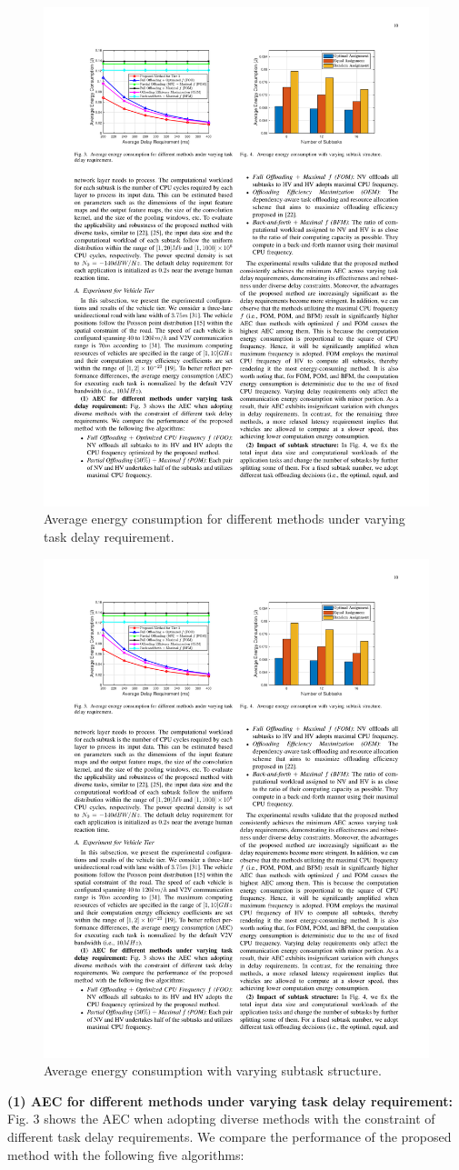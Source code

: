 \documentclass[lettersize,journal]{IEEEtran}
\begin{document}
\begin{figure}[!t]
\centering
\includegraphics[width=3 in]{Figures/Tier_1_E1}
\caption{Average energy consumption for different methods under varying task delay requirement.}
\label{fig_3}
\end{figure}

\begin{figure}[!t]
\centering
\includegraphics[width=3.0 in]{Figures/Tier_1_E2}
\caption{Average energy consumption with varying subtask structure.}
\label{fig_4}
\end{figure}




\textbf{(1) AEC for different methods under varying task delay requirement:} Fig. 3 shows the AEC when adopting diverse methods with the constraint of different task delay requirements. We compare the performance of the proposed method with the following five algorithms:
\end{document}
